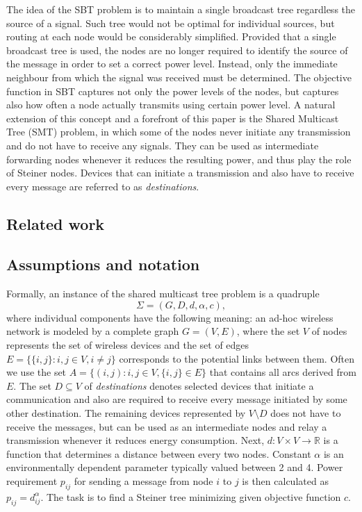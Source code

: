 The idea of the SBT problem is to maintain a single broadcast tree regardless the source of a signal. Such tree would not be optimal for individual sources, but routing at each node would be considerably simplified. Provided that a single broadcast tree is used, the nodes are no longer required to identify the source of the message in order to set a correct power level. Instead, only the immediate neighbour from which the signal was received must be determined. The objective function in SBT captures not only the power levels of the nodes, but captures also how often a node actually transmits using certain power level. A natural extension of this concept and a forefront of this paper is the Shared Multicast Tree (SMT) problem, in which some of the nodes never initiate any transmission and do not have to receive any signals. They can be used as intermediate forwarding nodes whenever it reduces the resulting power, and thus play the role of Steiner nodes. Devices that can initiate a transmission and also have to receive every message are referred to as \emph{destinations}.

\subsection{Related work}
\subsection{Assumptions and notation}
Formally, an instance of the shared multicast tree problem is a quadruple
$$
\Sigma=(G,D,d,\alpha,c),
$$
where individual components have the following meaning: an ad-hoc wireless network is modeled by a complete graph $G=(V,E)$, where the set $V$ of nodes represents the set of wireless devices and the set of edges $E=\{\{i,j\}:i,j\in V, i\neq j\}$ corresponds to the potential links between them. Often we use the set $A=\{(i,j):i,j\in V,\{i,j\}\in E\}$ that contains all arcs derived from $E$. The set $D\subseteq V$ of \emph{destinations} denotes selected devices that initiate a communication and also are required to receive every message initiated by some other destination. The remaining devices represented by $V\setminus D$ does not have to receive the messages, but can be used as an intermediate nodes and relay a transmission whenever it reduces energy consumption. Next, $d: V\times V\rightarrow \mathbb{R}$ is a function that determines a distance between every two nodes. Constant $\alpha$ is an environmentally dependent parameter typically valued between 2 and 4. Power requirement $p_{ij}$ for sending a message from node $i$ to $j$ is then calculated as $p_{ij}=d^{\alpha}_{ij}$. The task is to find a Steiner tree minimizing given objective function $c$.

